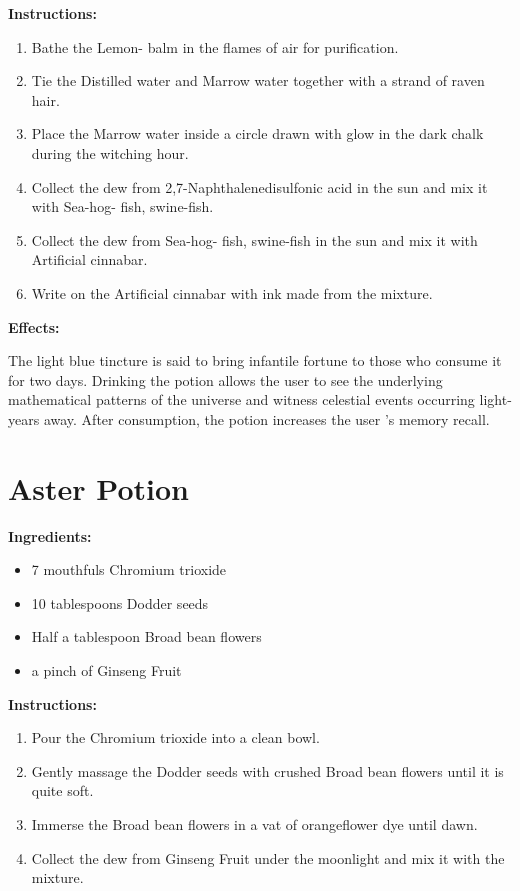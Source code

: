 \documentclass{article}
\begin{document}
\textbf{Instructions:}

\begin{enumerate}
  \item Bathe the Lemon- balm in the flames of air for purification.
  \item Tie the Distilled water and Marrow water together with a strand of raven hair.
  \item Place the Marrow water inside a circle drawn with glow in the dark chalk during the witching hour.
  \item Collect the dew from 2,7-Naphthalenedisulfonic acid in the sun and mix it with Sea-hog- fish, swine-fish.
  \item Collect the dew from Sea-hog- fish, swine-fish in the sun and mix it with Artificial cinnabar.
  \item Write on the Artificial cinnabar with ink made from the mixture.
\end{enumerate}

\textbf{Effects:}

The light blue tincture is said to bring infantile fortune to those who consume it for two days. Drinking the potion allows the user to see the underlying mathematical patterns of the universe and witness celestial events occurring light- years away. After consumption, the potion increases the user 's memory recall.

\newpage
\section*{Aster Potion}

\textbf{Ingredients:}

\begin{itemize}
  \item 7 mouthfuls Chromium trioxide
  \item 10 tablespoons Dodder seeds
  \item Half a tablespoon Broad bean flowers
  \item a pinch of Ginseng Fruit
\end{itemize}

\textbf{Instructions:}

\begin{enumerate}
  \item Pour the Chromium trioxide into a clean bowl.
  \item Gently massage the Dodder seeds with crushed Broad bean flowers until it is quite soft.
  \item Immerse the Broad bean flowers in a vat of orangeflower dye until dawn.
  \item Collect the dew from Ginseng Fruit under the moonlight and mix it with the mixture.
\end{enumerate}
\end{document}
